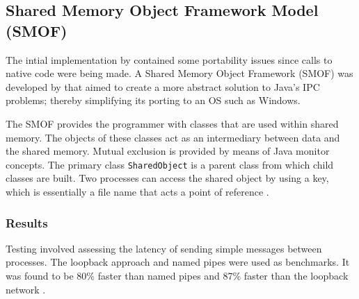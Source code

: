 \documentclass[12pt] {newrucsthesis}    %
\def\code#1{\texttt{#1}}
\begin{document}
      \subsection{Shared Memory Object Framework Model (SMOF)}
        The intial implementation by \cite{WellsIPCMultiProc} contained some
        portability issues since calls to native code were being made. A
        Shared Memory Object Framework (SMOF) was developed by \cite{WellsEfficientIPCJava} that aimed
        to create a more abstract solution to Java's IPC problems; thereby simplifying its porting
        to an OS such as Windows.

        The SMOF provides the programmer with classes that are used within shared memory. The objects of
        these classes act as an intermediary between data and the shared memory. Mutual exclusion is
        provided by means of Java monitor concepts. The primary class \code{SharedObject} is a parent
        class from which child classes are built. Two processes can access the shared object by using a
        key, which is essentially a file name that acts a point of reference \citep{WellsEfficientIPCJava}.

        \subsubsection{Results}
          Testing involved assessing the latency of sending simple messages between processes.
          The loopback approach and named pipes were used as benchmarks. It was found to be 80\% faster
          than named pipes and 87\% faster than the loopback network \citep{WellsEfficientIPCJava}.
\end{document}
